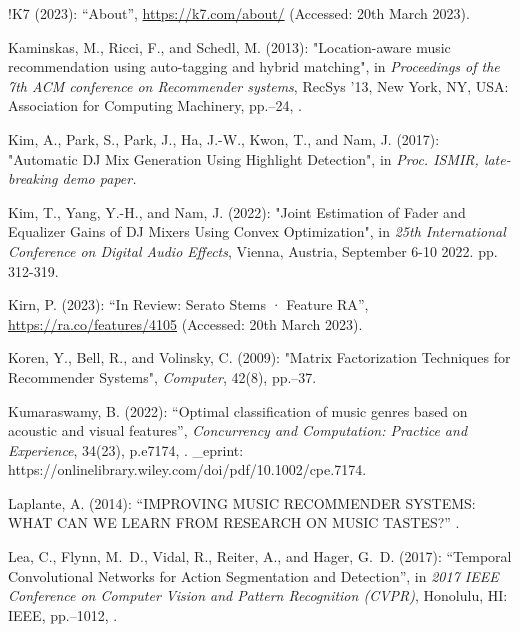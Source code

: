 \documentclass[11pt,titlepage,oneside]{book}
\begin{document}
\begin{thebibliography}{97}
	!K7 (2023): \enquote{About}, \urlprefix\url{https://k7.com/about/} (Accessed: 20th March 2023).
	
	Kaminskas, M., Ricci, F., and Schedl, M. (2013): "Location-aware music
		recommendation using auto-tagging and hybrid matching", in
	\textit{Proceedings of the 7th {ACM} conference on {Recommender} systems},
	{RecSys} '13, New York, NY, USA: Association for Computing Machinery,
	pp.--24, .
	
	Kim, A., Park, S., Park, J., Ha, J.-W., Kwon, T., and Nam, J. (2017):
	"Automatic {DJ} {Mix} {Generation} {Using} {Highlight} {Detection}", in \textit{Proc. ISMIR, late-breaking demo paper.}
	
	Kim, T., Yang, Y.-H., and Nam, J. (2022): "Joint {Estimation} of
		{Fader} and {Equalizer} {Gains} of {DJ} {Mixers} {Using} {Convex}
		{Optimization}", in \textit{25th International Conference on Digital Audio Effects}, Vienna, Austria, September 6-10 2022. pp. 312-319.
	
	Kirn, P. (2023): \enquote{In {Review}: {Serato} {Stems} · {Feature} {RA}},
	\urlprefix\url{https://ra.co/features/4105} (Accessed: 20th March 2023).
	
	Koren, Y., Bell, R., and Volinsky, C. (2009): "Matrix {Factorization}
		{Techniques} for {Recommender} {Systems}", \textit{Computer}, 42(8),
	pp.--37. 
	
	Kumaraswamy, B. (2022): \enquote{Optimal classification of music genres based
		on acoustic and visual features}, \textit{Concurrency and Computation:
		Practice and Experience}, 34(23), p.\ignorespaces e7174,
	. \_eprint:
	https://onlinelibrary.wiley.com/doi/pdf/10.1002/cpe.7174.
	
	Laplante, A. (2014): \enquote{{IMPROVING} {MUSIC} {RECOMMENDER} {SYSTEMS}:
		{WHAT} {CAN} {WE} {LEARN} {FROM} {RESEARCH} {ON} {MUSIC} {TASTES}?} .
	
	Lea, C., Flynn, M.~D., Vidal, R., Reiter, A., and Hager, G.~D. (2017):
	\enquote{Temporal {Convolutional} {Networks} for {Action} {Segmentation} and
		{Detection}}, in \textit{2017 {IEEE} {Conference} on {Computer} {Vision} and
		{Pattern} {Recognition} ({CVPR})}, Honolulu, HI: IEEE, pp.--1012, .
	

\end{thebibliography}
\end{document}
